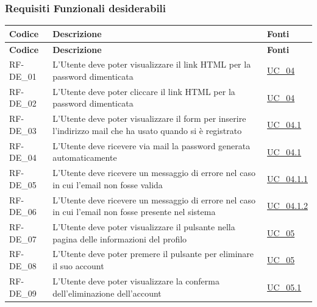 \subsubsection{Requisiti Funzionali desiderabili}
\renewcommand{\arraystretch}{1.15}
\begin{longtable}{|>{\raggedright}p{}|>{\raggedright\arraybackslash}p{}|>{\raggedright\arraybackslash}p{}|}
	\hline
	\rowcolor[gray]{0.9}
	\textbf{Codice} & \textbf{Descrizione} & \textbf{Fonti} \\
	\hline
	\endfirsthead
	
	\hline
	\rowcolor[gray]{0.9}
	\textbf{Codice} & \textbf{Descrizione} & \textbf{Fonti}  \\
	\hline
	\endhead
	
	\hline
	RF-DE\_01 \hypertarget{rf-de_1} & L'Utente deve poter visualizzare il link HTML per la password dimenticata & \hyperref[uc_04]{UC\_04} \\
	\hline
	RF-DE\_02 \hypertarget{rf-de_2} & L'Utente deve poter cliccare il link HTML per la password dimenticata & \hyperref[uc_04]{UC\_04} \\
	\hline
	RF-DE\_03 \hypertarget{rf-de_3} & L'Utente deve poter visualizzare il form per inserire l'indirizzo mail che ha usato quando si è registrato & \hyperref[uc_04.1]{UC\_04.1} \\
	\hline
	RF-DE\_04 \hypertarget{rf-de_4} & L'Utente deve ricevere via mail la password generata automaticamente & \hyperref[uc_04.1]{UC\_04.1} \\
	\hline
	RF-DE\_05 \hypertarget{rf-de_5} & L'Utente deve ricevere un messaggio di errore nel caso in cui l'email non fosse valida & \hyperref[uc_04.1.1]{UC\_04.1.1} \\
	\hline
	RF-DE\_06 \hypertarget{rf-de_6} & L'Utente deve ricevere un messaggio di errore nel caso in cui l'email non fosse presente nel sistema & \hyperref[uc_04.1.2]{UC\_04.1.2} \\
	\hline
	RF-DE\_07 \hypertarget{rf-de_7} & L'Utente deve poter visualizzare il pulsante \vr{Elimina Account} nella pagina delle informazioni del profilo & \hyperref[uc_05]{UC\_05} \\
	\hline
	RF-DE\_08 \hypertarget{rf-de_8} & L'Utente deve poter premere il pulsante per eliminare il suo account & \hyperref[uc_05]{UC\_05} \\
	\hline
	RF-DE\_09 \hypertarget{rf-de_9} & L'Utente deve poter visualizzare la conferma dell'eliminazione dell'account & \hyperref[uc_05.1]{UC\_05.1} \\

\end{longtable}
